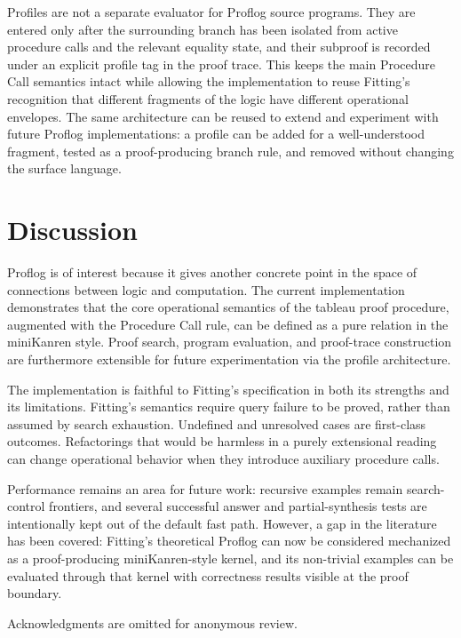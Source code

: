 \documentclass[acmsmall,screen,review,anonymous]{acmart}
\begin{document}
Profiles are not a separate evaluator for Proflog source programs.  They are
entered only after the surrounding branch has been isolated from active
procedure calls and the relevant equality state, and their subproof is recorded
under an explicit profile tag in the proof trace.  This keeps the main
Procedure Call semantics intact while allowing the implementation to reuse
Fitting's recognition that different fragments of the logic have different
operational envelopes.  The same architecture can be reused to extend and
experiment with future Proflog implementations: a profile can be added for a
well-understood fragment, tested as a proof-producing branch rule, and removed
without changing the surface language.

\section{Discussion}

Proflog is of interest because it gives another concrete point in the space of
connections between logic and computation.  The current implementation
demonstrates that the core operational semantics of the tableau proof
procedure, augmented with the Procedure Call rule, can be defined as a pure
relation in the miniKanren style.  Proof search, program evaluation, and
proof-trace construction are furthermore extensible for future experimentation
via the profile architecture.

The implementation is faithful to Fitting's specification in both its
strengths and its limitations.  Fitting's semantics require query failure to be
proved, rather than assumed by search exhaustion.  Undefined and unresolved
cases are first-class outcomes.  Refactorings that would be harmless in a
purely extensional reading can change operational behavior when they introduce
auxiliary procedure calls.

Performance remains an area for future work: recursive examples remain
search-control frontiers, and several successful answer and partial-synthesis
tests are intentionally kept out of the default fast path.  However, a gap in
the literature has been covered: Fitting's theoretical Proflog can now be
considered mechanized as a proof-producing miniKanren-style kernel, and its
non-trivial examples can be evaluated through that kernel with correctness
results visible at the proof boundary.

\begin{acks}
Acknowledgments are omitted for anonymous review.
\end{acks}




\end{document}

